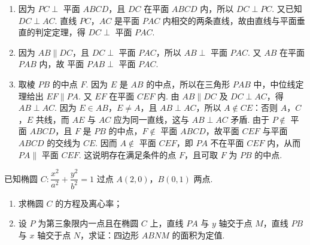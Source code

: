 \begin{solution}
\begin{enumerate}
\item 因为 \(PC\perp\) 平面 \(ABCD\)，且 \(DC\) 在平面 \(ABCD\) 内，所以 \(DC\perp PC\). 又已知 \(DC\perp AC\). 直线 \(PC\)，\(AC\) 是平面 \(PAC\) 内相交的两条直线，故由直线与平面垂直的判定定理，得
\(DC\perp\) 平面 \(PAC\).

\item 因为 \(AB\parallel DC\)，且 \(DC\perp\) 平面 \(PAC\)，所以 \(AB\perp\) 平面 \(PAC\). 又 \(AB\) 在平面 \(PAB\) 内，故
平面 \(PAB\perp\) 平面 \(PAC\).

\item 取棱 \(PB\) 的中点 \(F\). 因为 \(E\) 是 \(AB\) 的中点，所以在三角形 \(PAB\) 中，中位线定理给出
\(EF\parallel PA\).
又 \(EF\) 在平面 \(CEF\) 内. 由 \(AB\parallel DC\) 及 \(DC\perp AC\)，得 \(AB\perp AC\). 因为 \(E\in AB\)，\(E\ne A\)，且 \(AB\perp AC\)，所以 \(A\notin CE\)：否则 \(A\)，\(C\)，\(E\) 共线，而 \(AE\) 与 \(AC\) 应为同一直线，这与 \(AB\perp AC\) 矛盾. 由于 \(P\notin\) 平面 \(ABCD\)，且 \(F\) 是 \(PB\) 的中点，\(F\notin\) 平面 \(ABCD\)，故平面 \(CEF\) 与平面 \(ABCD\) 的交线为 \(CE\). 因而 \(A\notin\) 平面 \(CEF\)，即 \(PA\) 不在平面 \(CEF\) 内，从而
\(PA\parallel\) 平面 \(CEF\).
这说明存在满足条件的点 \(F\)，且可取 \(F\) 为 \(PB\) 的中点.
\end{enumerate}
\end{solution}

\begin{problem}
已知椭圆 \(C:\dfrac{x^2}{a^2}+\dfrac{y^2}{b^2}=1\) 过点 \(A(2,0)\)，\(B(0,1)\) 两点.

\begin{enumerate}
\item 求椭圆 \(C\) 的方程及离心率；
\item 设 \(P\) 为第三象限内一点且在椭圆 \(C\) 上，直线 \(PA\) 与 \(y\) 轴交于点 \(M\)，直线 \(PB\) 与 \(x\) 轴交于点 \(N\)，求证：四边形 \(ABNM\) 的面积为定值.
\end{enumerate}

\end{problem}

